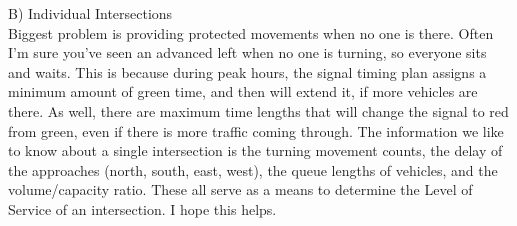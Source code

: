 \documentclass{report}
\begin{document}
\noindent B) Individual Intersections \\
Biggest problem is providing protected movements when no one is there.
Often I'm sure you've seen an advanced left when no one is turning, so everyone sits and waits.
This is because during peak hours, the signal timing plan assigns a minimum amount of green time, and then will extend it, if more vehicles are there.
As well, there are maximum time lengths that will change the signal to red from green, even if there is more traffic coming through.
The information we like to know about a single intersection is the turning movement counts, the delay of the approaches (north, south, east, west), the queue lengths of vehicles, and the volume/capacity ratio.
These all serve as a means to determine the Level of Service of an intersection.
I hope this helps.

\newpage
{}




\end{document}
